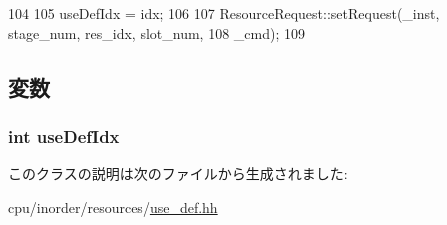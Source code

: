 \begin{DoxyCode}
104         {
105             useDefIdx = idx;
106 
107             ResourceRequest::setRequest(_inst, stage_num, res_idx, slot_num,
108                                         _cmd);
109         }
\end{DoxyCode}


\subsection{変数}
\hypertarget{classUseDefUnit_1_1UseDefRequest_a914fa352bad59c48972e8d71f40fc898}{
\subsubsection[{useDefIdx}]{\setlength{\rightskip}{0pt plus 5cm}int {\bf useDefIdx}}}
\label{classUseDefUnit_1_1UseDefRequest_a914fa352bad59c48972e8d71f40fc898}


このクラスの説明は次のファイルから生成されました:\begin{DoxyCompactItemize}
\item 
cpu/inorder/resources/\hyperlink{use__def_8hh}{use\_\-def.hh}\end{DoxyCompactItemize}
